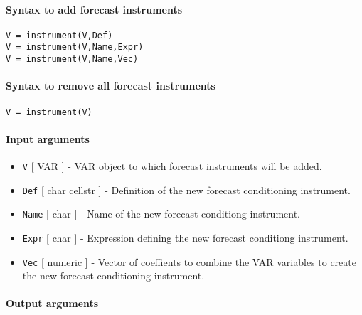 


	\paragraph{Syntax to add forecast
instruments}

\begin{verbatim}
V = instrument(V,Def)
V = instrument(V,Name,Expr)
V = instrument(V,Name,Vec)
\end{verbatim}

\paragraph{Syntax to remove all forecast
instruments}

\begin{verbatim}
V = instrument(V)
\end{verbatim}

\paragraph{Input arguments}

\begin{itemize}
\item
  \texttt{V} {[} VAR {]} - VAR object to which forecast instruments will
  be added.
\item
  \texttt{Def} {[} char \textbar{} cellstr {]} - Definition of the new
  forecast conditioning instrument.
\item
  \texttt{Name} {[} char {]} - Name of the new forecast conditiong
  instrument.
\item
  \texttt{Expr} {[} char {]} - Expression defining the new forecast
  conditiong instrument.
\item
  \texttt{Vec} {[} numeric {]} - Vector of coeffients to combine the VAR
  variables to create the new forecast conditioning instrument.
\end{itemize}

\paragraph{Output arguments}


